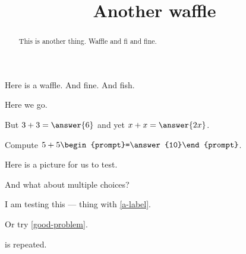 \documentclass{ximera}
\title{Another waffle}
\begin{document}
\begin{abstract}
  This is another thing.  Waffle and fi and fine.
\end{abstract}
\maketitle

Here is a waffle.  And fine.  And fish.

Here we go.

\begin{problem}
  But $3 + 3 = \answer{6}$ and yet $x + x = \answer{2x}$.
\end{problem}

\begin{foldable}
\begin{problem}
  Compute $5 + 5 \begin{prompt}=\answer{10}\end{prompt}$.
\end{problem}
\end{foldable}

Here is a picture for us to test.

\begin{image}
\end{image}
 
And what about multiple choices?
\begin{problem}
\begin{multipleChoice}
\end{multipleChoice}
\end{problem}

I am testing this ---
 thing with \ref{a-label}.

Or try \ref{good-problem}.

\begin{theorem}
  \label{thm:another}
\end{theorem}

\begin{corollary}
  \label{thm:whee} is repeated.
\end{corollary}
\end{document}
